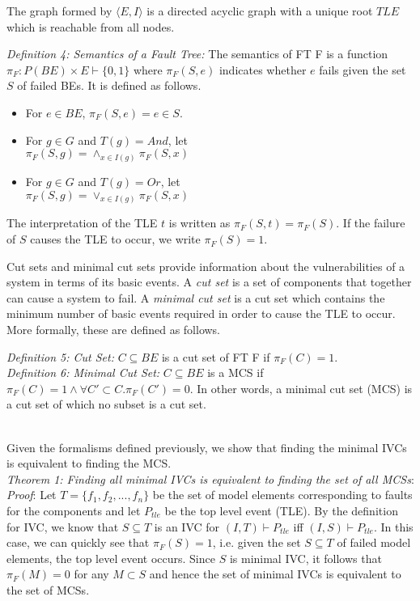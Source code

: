 The graph formed by $\langle E, I \rangle$ is a directed acyclic graph with a unique root $TLE$ which is reachable from all nodes. 

\textit{Definition 4: Semantics of a Fault Tree:} The semantics of FT F is a function $\pi_F : P(BE) \times E \vdash \{0,1\}$ where $\pi_F(S, e)$ indicates whether $e$ fails given the set $S$ of failed BEs. It is defined as follows. 

\begin{itemize}
\item For $e \in BE$, $\pi_F(S,e) = e \in S$.
\item For $g \in G$ and $T(g) = And$, let\\ $\pi_F(S,g) = \land_{x \in I(g)} \pi_F(S, x)$
\item For $g \in G$ and $T(g) = Or$, let\\ $\pi_F(S,g) = \lor_{x \in I(g)} \pi_F(S, x)$ 
\end{itemize}

The interpretation of the TLE $t$ is written as $\pi_F(S,t) = \pi_F(S)$. If the failure of $S$ causes the TLE to occur, we write $\pi_F(S) = 1$. 

Cut sets and minimal cut sets provide information about the vulnerabilities of a system in terms of its basic events. A \textit{cut set} is a set of components that together can cause a system to fail. A \textit{minimal cut set} is a cut set which contains the minimum number of basic events required in order to cause the TLE to occur. More formally, these are defined as follows. 

\textit{Definition 5: Cut Set:} $C \subseteq BE$ is a cut set of FT F if $\pi_F(C) = 1$. \\

\textit{Definition 6: Minimal Cut Set:} $C \subseteq BE$ is a MCS if $\pi_F(C) = 1 \land \forall C' \subset C. \pi_F(C') = 0$. In other words, a minimal cut set (MCS) is a cut set of which no subset is a cut set. 

\\
Given the formalisms defined previously, we show that finding the minimal IVCs is equivalent to finding the MCS. \\

\textit{Theorem 1: Finding all minimal IVCs is equivalent to finding the set of all MCSs}:\\
\textit{Proof}: Let $T = \{f_1, f_2, ..., f_n\}$ be the set of model elements corresponding to faults for the components and let $P_{tle}$ be the top level event (TLE). By the definition for IVC, we know that $S \subseteq T$ is an IVC for $(I, T) \vdash P_{tle}$ iff $(I, S) \vdash P_{tle}$. 
In this case, we can quickly see that $\pi_F(S) = 1$, i.e. given the set $S \subseteq T$ of failed model elements, the top level event occurs. 
Since $S$ is minimal IVC, it follows that $\pi_F(M) = 0$ for any $M \subset S$ and hence the set of minimal IVCs is equivalent to the set of MCSs. 







